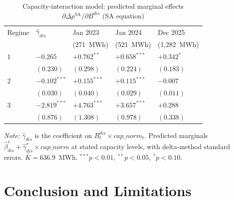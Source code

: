 \documentclass[12pt,a4paper]{article}
\newcommand{\dsa}{\Delta p^{\mathrm{SA}}}
\begin{document}
\begin{table}[htbp]
  \centering
  \caption{Capacity-interaction model: predicted marginal effects
    $\partial\dsa/\partial B^{dis}$ (SA equation)}
  \label{tab:interact}
  \begin{threeparttable}
    \begin{tabular}{lC{2.0cm}C{2.4cm}C{2.4cm}C{2.4cm}}
      \toprule
      Regime & $\hat\gamma_{dis}$ & Jan 2023 & Jan 2024 & Dec 2025 \\
      & & (271~MWh) & (521~MWh) & (1{,}282~MWh) \\
       & $-0.265$ & $+0.762^{**}$ & $+0.658^{***}$ & $+0.342^{*}$ \\
        & $(0.230)$ & $(0.298)$ & $(0.224)$ & $(0.183)$ \\[3pt]
      2 & $-0.102^{***}$ & $+0.155^{***}$ & $+0.115^{***}$ & $-0.007$ \\
        & $(0.030)$ & $(0.040)$ & $(0.029)$ & $(0.011)$ \\[3pt]
      3 & $-2.819^{***}$ & $+4.763^{***}$ & $+3.657^{***}$ & $+0.288$ \\
        & $(0.876)$ & $(1.308)$ & $(0.978)$ & $(0.338)$ \\
      \bottomrule
    \end{tabular}
    \begin{tablenotes}
      \small
      \item \textit{Note:} $\hat\gamma_{dis}$ is the coefficient on
        $B_t^{dis} \times cap\_norm_t$.  Predicted marginals
        $\hat\beta_{dis}^r + \hat\gamma_{dis}^r \times cap\_norm$ at stated
        capacity levels, with delta-method standard errors.
        $\bar{K} = 636.9$~MWh.
        $^{***}p<0.01$, $^{**}p<0.05$, $^{*}p<0.10$.
    \end{tablenotes}
  \end{threeparttable}
\end{table}

\section{Conclusion and Limitations}
\label{sec:conclusion}
\end{document}
